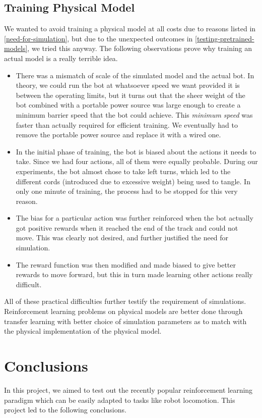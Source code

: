 \documentclass[12pt]{extreport}
\theoremstyle{plain}
\theoremstyle{definition}
\begin{document}
\section{Training Physical Model}

We wanted to avoid training a physical model at all costs due to reasons listed in \autoref{need-for-simulation}, but due to the unexpected outcomes in \autoref{testing-pretrained-models}, we tried this anyway. The following observations prove why training an actual model is a really terrible idea.

\begin{itemize}
    \item There was a mismatch of scale of the simulated model and the actual bot. In theory, we could run the bot at whatsoever speed we want provided it is between the operating limits, but it turns out that the sheer weight of the bot combined with a portable power source was large enough to create a minimum barrier speed that the bot could achieve. This \emph{minimum speed} was faster than actually required for efficient training. We eventually had to remove the portable power source and replace it with a wired one.
    \item In the initial phase of training, the bot is biased about the actions it needs to take. Since we had four actions, all of them were equally probable. During our experiments, the bot almost chose to take left turns, which led to the different cords (introduced due to excessive weight) being used to tangle. In only one minute of training, the process had to be stopped for this very reason.
    \item The bias for a particular action was further reinforced when the bot actually got positive rewards when it reached the end of the track and could not move. This was clearly not desired, and further justified the need for simulation.
    \item The reward function was then modified and made biased to give better rewards to move forward, but this in turn made learning other actions really difficult.
\end{itemize}

All of these practical difficulties further testify the requirement of simulations. Reinforcement learning problems on physical models are better done through transfer learning with better choice of simulation parameters as to match with the physical implementation of the physical model.

\chapter{Conclusions}
In this project, we aimed to test out the recently popular reinforcement learning paradigm which can be easily adapted to tasks like robot locomotion. This project led to the following conclusions.
\end{document}
